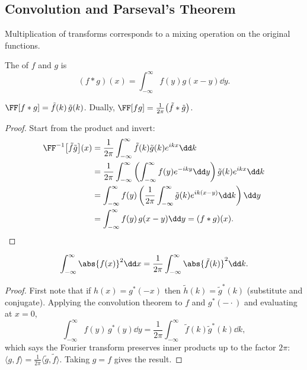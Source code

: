\subsection{Convolution and Parseval's Theorem}

Multiplication of transforms corresponds to a mixing operation on the original functions.

\begin{definition}[Convolution]
    The  of $f$ and $g$ is
    $$
    (f * g)(x) = \int_{-\infty}^{\infty} f(y) g(x - y) \dd y.
    $$
\end{definition}

\begin{theorem}
    $\FF[f * g] = \tilde{f}(k)\, \tilde{g}(k)$. Dually, $\FF[fg] = \frac{1}{2\pi} \big(\tilde{f} * \tilde{g}\big)$.
\end{theorem}
\begin{proof}
    Start from the product and invert:
    \begin{align*}
        \FF^{-1}\big[\tilde f \tilde g\big](x) &= \frac{1}{2\pi}\int_{-\infty}^{\infty} \tilde{f}(k) \tilde{g}(k) e^{ikx} \dd k \\
        &= \frac{1}{2\pi}\int_{-\infty}^{\infty} \left(\int_{-\infty}^{\infty} f(y) e^{-iky} \dd y\right) \tilde{g}(k) e^{ikx} \dd k \\
        &= \int_{-\infty}^{\infty} f(y) \left(\frac{1}{2 \pi}\int_{-\infty}^{\infty} \tilde{g}(k) e^{ik(x - y)} \dd k\right) \dd y \\
        &= \int_{-\infty}^{\infty} f(y)\, g(x - y) \dd y = (f * g)(x). \qedhere
    \end{align*}
\end{proof}

\begin{theorem}
    $$
    \int_{-\infty}^{\infty} \abs{f(x)}^2 \dd x = \frac{1}{2\pi} \int_{-\infty}^{\infty} \abs{\tilde{f}(k)}^2 \dd k.
    $$
\end{theorem}
\begin{proof}
    First note that if $h(x) = g^*(-x)$ then $\tilde{h}(k) = \tilde{g}^*(k)$ (substitute and conjugate). Applying the convolution theorem to $f$ and $g^*(-\cdot)$ and evaluating at $x = 0$,
    $$
    \int_{-\infty}^{\infty} f(y)\, g^*(y) \dd y = \frac{1}{2\pi}\int_{-\infty}^{\infty} \tilde{f}(k) \tilde{g}^*(k) \dd k,
    $$
    which says the Fourier transform preserves inner products up to the factor $2\pi$: $\langle g, f\rangle = \frac{1}{2\pi}\langle \tilde{g}, \tilde{f} \rangle$. Taking $g = f$ gives the result.
\end{proof}

